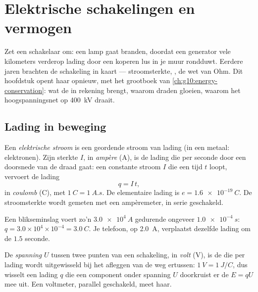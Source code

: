 \chapter{Elektrische schakelingen en vermogen}\label{ch:g11:circuits-and-power}

Zet een schakelaar om: een lamp gaat branden, doordat een generator vele
kilometers verderop lading door een koperen lus in je muur rondduwt.
Eerdere jaren brachten de schakeling in kaart --- stroomsterkte, ,
de wet van Ohm. Dit hoofdstuk opent haar opnieuw, met het grootboek van
\cref{ch:g10:energy-conservation}: wat de  in rekening brengt,
waarom  draden gloeien, waarom het hoogspanningsnet op \qty{400}{kV}
draait.

\section{Lading in beweging}

\begin{definition}\label{def:g11:circuits-and-power:current}
Een \emph{elektrische stroom} is een geordende
stroom van lading (in een metaal: elektronen). Zijn sterkte $I$, in
\emph{ampère} (\unit{A}), is de lading die per seconde door
een doorsnede van de draad gaat: een constante stroom $I$ die een tijd
$t$ loopt, vervoert de lading
\[ q = I\,t , \]
in \emph{coulomb} (\unit{C}), met $\qty{1}{C} =
\qty{1}{A.s}$. De elementaire lading is $e = \qty{1.6e-19}{C}$. De
stroomsterkte wordt gemeten met een ampèremeter, in serie geschakeld.
\end{definition}

\begin{example}\label{ex:g11:circuits-and-power:coulomb}
Een blikseminslag voert zo'n $\qty{3.0e4}{A}$ gedurende ongeveer
$\qty{1.0e-4}{s}$: $q = 3.0\times10^{4} \times 10^{-4} = \qty{3.0}{C}$.
Je telefoon, op \qty{2.0}{A}, verplaatst dezelfde lading om de $1.5$
seconde.
\end{example}

\begin{definition}\label{def:g11:circuits-and-power:voltage}
De \emph{spanning} $U$ tussen twee punten van een
schakeling, in \emph{volt} (\unit{V}), is de  die per
 lading wordt uitgewisseld bij het afleggen van de weg ertussen:
$\qty{1}{V} = \qty{1}{J/C}$, dus wisselt een lading $q$ die een component
onder spanning $U$ doorkruist er de  $E = qU$ mee uit. Een
voltmeter, parallel geschakeld, meet haar.
\end{definition}


